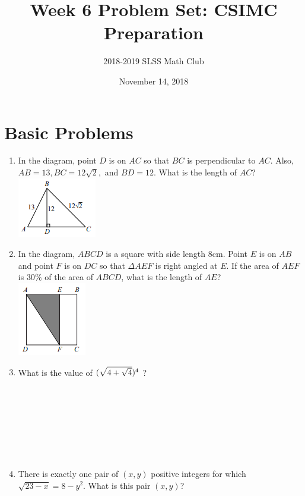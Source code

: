 \documentclass[12pt]{article}
\title{Week 6 Problem Set: CSIMC Preparation\vspace{-3mm}}
\author{2018-2019 SLSS Math Club\vspace{-5mm}}
\date{November 14, 2018\vspace{-5mm}}
\begin{document}
\maketitle

\newcommand{\bspace}{\\ \\ \\ \\ \\ \\ \\ \\}
\section*{Basic Problems}
\begin{enumerate}
    \item In the diagram, point $D$ is on $AC$ so that $BC$ is perpendicular to $AC$. Also, $AB = 13, BC = 12\sqrt{2},$ and $BD=12$. What is the length of $AC$? \\ \includegraphics[scale = 1.85]{Graphics/Week_6/d2.PNG}
    \item In the diagram, $ABCD$ is a square with side length $8$cm. Point $E$ is on $AB$ and point $F$ is on $DC$ so that $\Delta AEF$ is right angled at $E$. If the area of $AEF$ is $30\%$ of the area of $ABCD$, what is the length of $AE$? \\ \includegraphics[scale = 1.85]{Graphics/Week_6/d1.PNG}
    \item What is the value of $\Large(\sqrt{4 + \sqrt{4}} \Large)^4$ ? \bspace
    \item There is exactly one pair of $(x, y)$ positive integers for which $\sqrt{23 - x} = 8 - y^2$. What is this pair $(x, y)$?  
\end{enumerate} \newpage

\newcommand{\interspace}{\\ \\ \\ \\ \\ \\ \\ \\}
\end{document}
